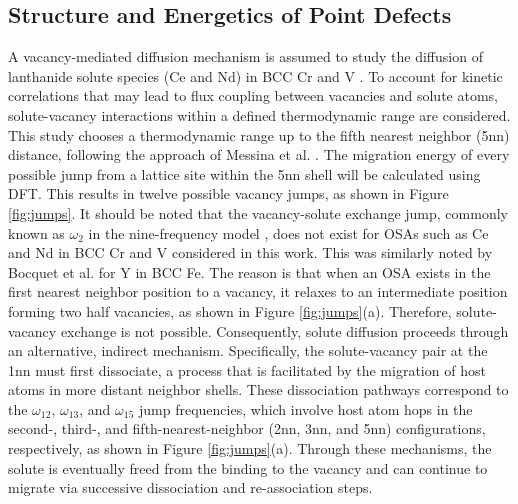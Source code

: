\documentclass[preprint,12pt]{elsarticle}
\begin{document}
\subsection{Structure and Energetics of Point Defects}
\label{sec:methods_energetics}
A vacancy-mediated diffusion mechanism is assumed to study the diffusion of lanthanide solute species (Ce and Nd) in BCC Cr and V \cite{yang_significant_2023, bocquet_migration_2017}. To account for kinetic correlations that may lead to flux coupling between vacancies and solute atoms, solute-vacancy interactions within a defined thermodynamic range are considered. This study chooses a thermodynamic range up to the fifth nearest neighbor (5nn) distance, following the approach of Messina et al. \cite{messina_exact_2014,MESSINA201328}. The migration energy of every possible jump from a lattice site within the 5nn shell will be calculated using DFT. This results in twelve possible vacancy jumps, as shown in Figure \ref{fig:jumps}. It should be noted that the vacancy-solute exchange jump, commonly known as $\omega_2$ in the nine-frequency model \cite{leclaire1970solvent}, does not exist for OSAs such as Ce and Nd in BCC Cr and V considered in this work. This was similarly noted by Bocquet et al. \cite{bocquet_migration_2017} for Y in BCC Fe. The reason is that when an OSA exists in the first nearest neighbor position to a vacancy, it relaxes to an intermediate position forming two half vacancies, as shown in Figure \ref{fig:jumps}(a). Therefore, solute-vacancy exchange is not possible.
Consequently, solute diffusion proceeds through an alternative, indirect mechanism. Specifically, the solute-vacancy pair at the 1nn must first dissociate, a process that is facilitated by the migration of host atoms in more distant neighbor shells. These dissociation pathways correspond to the $\omega_{12}$, $\omega_{13}$, and $\omega_{15}$ jump frequencies, which involve host atom hops in the second-, third-, and fifth-nearest-neighbor (2nn, 3nn, and 5nn) configurations, respectively, as shown in Figure \ref{fig:jumps}(a). Through these mechanisms, the solute is eventually freed from the binding to the vacancy and can continue to migrate via successive dissociation and re-association steps.
\end{document}
